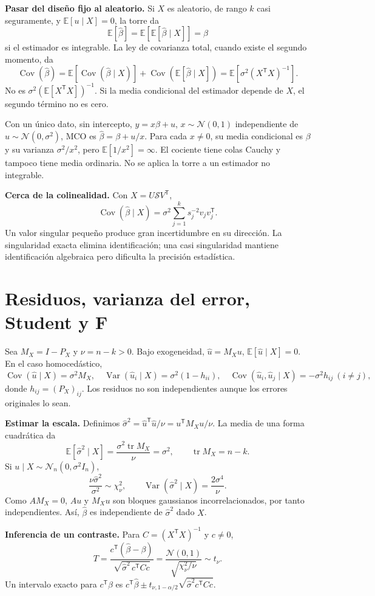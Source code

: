 \documentclass[11pt,a4paper]{article}
\newcommand{\E}{\mathbb E}
\newcommand{\T}{^{\mathsf T}}
\DeclareMathOperator{\Var}{Var}
\DeclareMathOperator{\Cov}{Cov}
\DeclareMathOperator{\tr}{tr}
\newcommand{\Normal}{\mathcal N}
\newcommand{\topic}[2]{\clearpage\section{#1}\label{#2}}
\theoremstyle{definition}\newtheorem{definicion}[teorema]{Definición}
\begin{document}
\textbf{Pasar del diseño fijo al aleatorio.}
Si $X$ es aleatorio, de rango $k$ casi seguramente, y
$\E[u\mid X]=0$, la torre da
\[
\E[\widehat\beta]=\E[\E[\widehat\beta\mid X]]=\beta
\]
si el estimador es integrable.
La ley de covarianza total, cuando existe el segundo momento, da
\[
\Cov(\widehat\beta)
=\E[\Cov(\widehat\beta\mid X)]
+\Cov(\E[\widehat\beta\mid X])
=\boxed{\E[\sigma^2(X\T X)^{-1}]}.
\]
No es $\sigma^2(\E[X\T X])^{-1}$.
Si la media condicional del estimador depende de $X$,
el segundo término no es cero.

\begin{ejemplo}
Con un único dato, sin intercepto, $y=x\beta+u$,
$x\sim\Normal(0,1)$ independiente de $u\sim\Normal(0,\sigma^2)$,
MCO es $\widehat\beta=\beta+u/x$.
Para cada $x\ne0$, su media condicional es $\beta$ y su varianza
$\sigma^2/x^2$, pero $\E[1/x^2]=\infty$.
El cociente tiene colas Cauchy y tampoco tiene media ordinaria.
No se aplica la torre a un estimador no integrable.
\end{ejemplo}
\textbf{Cerca de la colinealidad.}
Con $X=U\mathcal S V\T$,
\[
\Cov(\widehat\beta\mid X)=
\sigma^2\sum_{j=1}^k s_j^{-2}v_jv_j\T.
\]
Un valor singular pequeño produce gran incertidumbre en su dirección.
La singularidad exacta elimina identificación; una casi singularidad
mantiene identificación algebraica pero dificulta la precisión estadística.

\topic{Residuos, varianza del error, Student y F}{s36}
Sea $M_X=I-P_X$ y $\nu=n-k>0$. Bajo exogeneidad,
$\widehat u=M_Xu$, $\E[\widehat u\mid X]=0$.
En el caso homocedástico,
\[
\Cov(\widehat u\mid X)=\sigma^2M_X,\quad
\Var(\widehat u_i\mid X)=\sigma^2(1-h_{ii}),
\quad \Cov(\widehat u_i,\widehat u_j\mid X)=-\sigma^2h_{ij}\ (i\ne j),
\]
donde $h_{ij}=(P_X)_{ij}$.
Los residuos no son independientes aunque los errores originales lo sean.

\textbf{Estimar la escala.}
Definimos $\widehat\sigma^2=\widehat u\T\widehat u/\nu=u\T M_Xu/\nu$.
La media de una forma cuadrática da
\[
\E[\widehat\sigma^2\mid X]
=\frac{\sigma^2\tr M_X}{\nu}
=\sigma^2,\qquad \tr M_X=n-k.
\]
Si $u\mid X\sim\Normal_n(0,\sigma^2I_n)$,
\[
\frac{\nu\widehat\sigma^2}{\sigma^2}\sim\chi^2_\nu,
\qquad \Var(\widehat\sigma^2\mid X)=\frac{2\sigma^4}{\nu}.
\]
Como $AM_X=0$, $Au$ y $M_Xu$ son bloques gaussianos
incorrelacionados, por tanto independientes.
Así, $\widehat\beta$ es independiente de $\widehat\sigma^2$ dado $X$.

\textbf{Inferencia de un contraste.}
Para $C=(X\T X)^{-1}$ y $c\ne0$,
\[
T=\frac{c\T(\widehat\beta-\beta)}
{\sqrt{\widehat\sigma^2\,c\T Cc}}
=\frac{\Normal(0,1)}{\sqrt{\chi^2_\nu/\nu}}
\sim t_\nu.
\]
Un intervalo exacto para $c\T\beta$ es
$c\T\widehat\beta\pm t_{\nu,1-\alpha/2}
\sqrt{\widehat\sigma^2c\T Cc}$.
\end{document}
